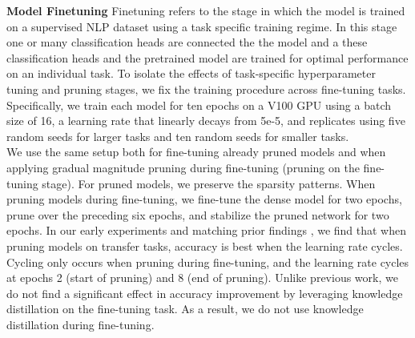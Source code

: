 \textbf{Model Finetuning}
Finetuning refers to the stage in which the model is trained on a supervised NLP dataset using a task specific training regime. In this stage one or many classification heads are connected the the model and a these classification heads and the pretrained model are trained for optimal performance on an individual task.
To isolate the effects of task-specific hyperparameter tuning and pruning stages, we fix the training procedure across fine-tuning tasks. Specifically, we train each model for ten epochs on a V100 GPU using a batch size of 16, a learning rate that linearly decays from 5e-5, and replicates using five random seeds for larger tasks and ten random seeds for smaller tasks. \\
We use the same setup both for fine-tuning already pruned models and when applying gradual magnitude pruning during fine-tuning (pruning on the fine-tuning stage). For pruned models, we preserve the sparsity patterns. When pruning models during fine-tuning, we fine-tune the dense model for two epochs, prune over the preceding six epochs, and stabilize the pruned network for two epochs. In our early experiments and matching prior findings \cite{Zafrir2021PruneOF}, we find that when pruning models on transfer tasks, accuracy is best when the learning rate cycles. Cycling only occurs when pruning during fine-tuning, and the learning rate cycles at epochs 2 (start of pruning) and 8 (end of pruning). Unlike previous work, we do not find a significant effect in accuracy improvement by leveraging knowledge distillation on the fine-tuning task. As a result, we do not use knowledge distillation during fine-tuning.
